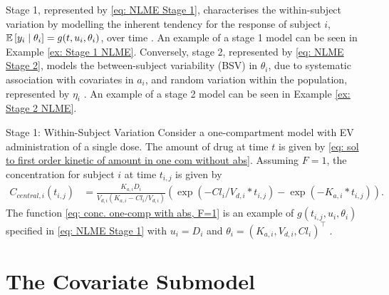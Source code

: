Stage 1, represented by \eqref{eq: NLME Stage 1}, characterises the within-subject variation by modelling the inherent tendency for the response of subject $i$, $\mathbb{E}\left[{y_{i} \mid \theta_i}\right] = g(t,u_i,\theta_i)$, over time \citep[pp. 395-396]{Davidian2003}. An example of a stage 1 model can be seen in Example \ref{ex: Stage 1 NLME}. Conversely, stage 2, represented by \eqref{eq: NLME Stage 2}, models the between-subject variability (BSV) in $\theta_i$, due to systematic association with covariates in $a_i$, and random variation within the population, represented by $\eta_i$ \citep[p. 393]{Davidian2003}. An example of a stage 2 model can be seen in Example \ref{ex: Stage 2 NLME}. 

\begin{exmp}{Stage 1: Within-Subject Variation}
Consider a one-compartment model with EV administration of a single dose. The amount of drug at time $t$ is given by \eqref{eq: sol to first order kinetic of amount in one com without abs}. Assuming $F=1$, the concentration for subject $i$ at time $t_{i,j}$ is given by 
\begin{align}
        C_{central,i}(t_{i,j}) &= \frac{K_{a,i} D_i}{V_{d,i}(K_{a,i} - Cl_i/V_{d,i})} \left( \exp(-Cl_i/V_{d,i} * t_{i,j}) - \exp(-K_{a,i} * t_{i,j}) \right).\label{eq: conc. one-comp with abs, F=1}
\end{align}
The function \eqref{eq: conc. one-comp with abs, F=1} is an example of  $g(t_{i,j}, u_i, \theta_i)$ specified in \eqref{eq: NLME Stage 1} with $u_i=D_i$ and $\theta_i=(K_{a,i}, V_{d,i}, Cl_i)^\top$ \citep[pp. 388-389]{Davidian2003}. 
\label{ex: Stage 1 NLME}
\end{exmp}

\section{The Covariate Submodel} \label{sec: covariate model}




